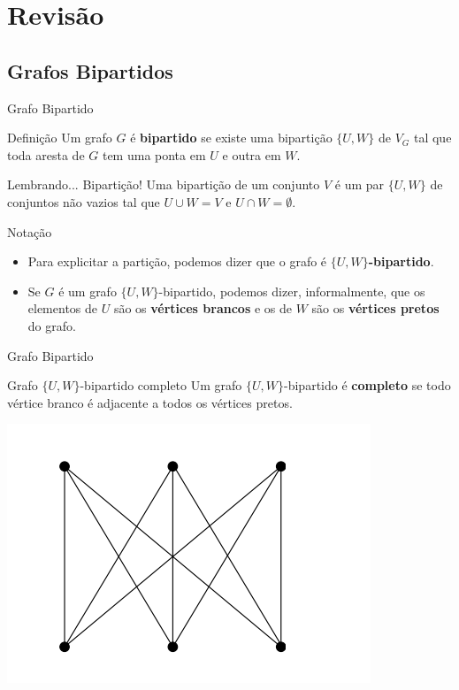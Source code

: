 \documentclass[xcolor=dvipsnames,table]{beamer}
\begin{document}
    \section{Revisão}
	
	\subsection{Grafos Bipartidos}
	\begin{frame}[shrink]{Grafo Bipartido}
		\begin{block}{Definição}
			Um grafo $G$ é {\bf bipartido} se existe uma bipartição $\{U, W \}$ de $V_G$ tal que toda aresta de $G$ tem uma ponta em $U$ e outra em $W$.
		\end{block}
		\begin{block}{Lembrando... Bipartição!}
			Uma bipartição de um conjunto $V$ é um par $\{U, W\}$ de conjuntos não vazios tal que $U \cup W = V$ e $U \cap W = \emptyset$.
		\end{block} 
		\begin{block}{Notação}
			\begin{itemize}
				\item Para explicitar a partição, podemos dizer que o grafo é {\bf $\{ U, W \}$-bipartido}.
				\item Se $G$ é um grafo $\{ U, W \}$-bipartido, podemos dizer, informalmente, que os elementos de $U$ são os {\bf vértices brancos} e os de $W$ são os {\bf vértices pretos} do grafo.
			\end{itemize}
		\end{block} 
	\end{frame}
	
	\begin{frame}{Grafo Bipartido}
		\begin{block}{Grafo $\{ U, W \}$-bipartido completo}
			Um grafo $\{U, W \}$-bipartido é {\bf completo} se todo vértice branco é adjacente a todos os vértices pretos. 
		\end{block}
		\begin{center}
			\includegraphics[width=.6\textwidth]{images/bipartido-completo.png}
		\end{center}
	\end{frame}
	
\end{document}
